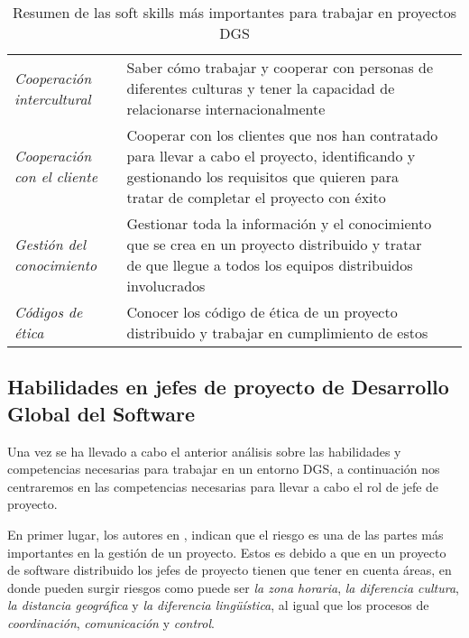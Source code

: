 \begin{table}[htbp]
{\begin{tabular}{lp{33.5em}c}
        \rowcolor[rgb]{ .949,  .949,  .949} \textit{Cooperación intercultural} & \cellcolor[rgb]{ 1,  1,  1}Saber cómo trabajar y cooperar con personas de diferentes culturas y tener la capacidad de relacionarse internacionalmente & \cellcolor[rgb]{ 1,  1,  1}\cite{bosnic2019assessing, paasivaara2013teaching, saldana2014skills} \\
        \rowcolor[rgb]{ .949,  .949,  .949} \textit{Cooperación con el cliente} & \cellcolor[rgb]{ 1,  1,  1}Cooperar con los clientes que nos han contratado para llevar a cabo el proyecto, identificando y gestionando los requisitos que quieren para tratar de completar el proyecto con éxito & \cellcolor[rgb]{ 1,  1,  1}\cite{bosnic2019assessing, damian2006instructional, saldana2014skills} \\
        \rowcolor[rgb]{ .949,  .949,  .949} \textit{Gestión del conocimiento} & \cellcolor[rgb]{ 1,  1,  1}Gestionar toda la información y el conocimiento que se crea en un proyecto distribuido y tratar de que llegue a todos los equipos distribuidos involucrados & \cellcolor[rgb]{ 1,  1,  1}\cite{saldana2014skills} \\
        \rowcolor[rgb]{ .949,  .949,  .949} \textit{Códigos de ética} & \cellcolor[rgb]{ 1,  1,  1}Conocer los código de ética de un proyecto distribuido y trabajar en \newline{}cumplimiento de estos & \cellcolor[rgb]{ 1,  1,  1}\cite{monasor2010training} \\
    \end{tabular}}
  \caption{Resumen de las soft skills más importantes para trabajar en proyectos DGS}
  \label{tab:SoftSkillsDGS}
\end{table}


\subsection{Habilidades en jefes de proyecto de Desarrollo Global del Software}
\label{sec:HabilidadesJP}

Una vez se ha llevado a cabo el anterior análisis sobre las habilidades y competencias necesarias para trabajar en un entorno DGS, a continuación nos centraremos en las competencias necesarias para llevar a cabo el rol de jefe de proyecto.

En primer lugar, los autores en \cite{verner2014risks}, indican que el riesgo es una de las partes más importantes en la gestión de un proyecto. Estos es debido a que en un proyecto de software distribuido los jefes de proyecto tienen que tener en cuenta áreas, en donde pueden surgir riesgos como puede ser \emph{la zona horaria}, \emph{la diferencia cultura}, \emph{la distancia geográfica} y \emph{la diferencia lingüística}, al igual que los procesos de \emph{coordinación}, \emph{comunicación} y \emph{control}.

